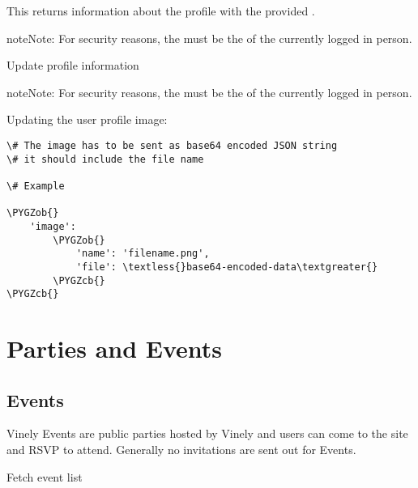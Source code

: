 \documentclass[letterpaper,10pt,english]{sphinxmanual}
\def\PYGZob{\char`\{}
\def\PYGZcb{\char`\}}
\begin{document}
This returns information about the profile with the provided .

\begin{notice}{note}{Note:}
For security reasons, the  must be the  of the currently logged in person.
\end{notice}

Update profile information


\begin{fulllineitems}
\label{accounts:put--api-v1-profile-_id_-}
\end{fulllineitems}


\begin{notice}{note}{Note:}
For security reasons, the  must be the  of the currently logged in person.
\end{notice}

Updating the user profile image:

\begin{Verbatim}[commandchars=\\\{\}]
\# The image has to be sent as base64 encoded JSON string
\# it should include the file name

\# Example

\PYGZob{}
    'image':
        \PYGZob{}
            'name': 'filename.png',
            'file': \textless{}base64-encoded-data\textgreater{}
        \PYGZcb{}
\PYGZcb{}
\end{Verbatim}


\chapter{Parties and Events}
\label{parties:parties-and-events}\label{parties:ref-parties}\label{parties::doc}

\section{Events}
\label{parties:events}
Vinely Events are public parties hosted by Vinely and users can come to the site and RSVP to attend.
Generally no invitations are sent out for Events.

Fetch event list


\begin{fulllineitems}
\label{parties:get--api-v1-event-}
\end{fulllineitems}
\end{document}
